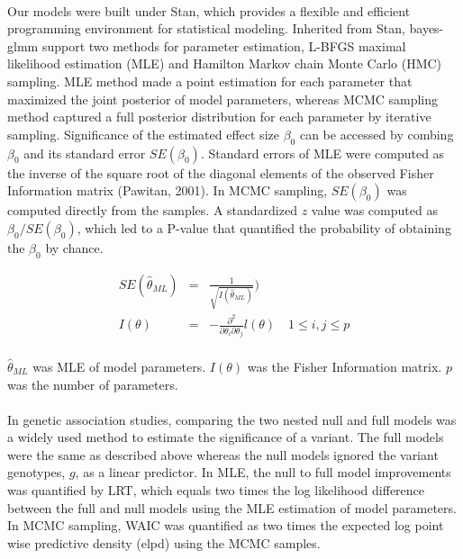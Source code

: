 \documentclass[12pt]{article}
\begin{document}
\paragraph{}{
Our models were built under Stan, which provides a flexible and efficient programming environment for statistical modeling. Inherited from Stan, bayes-glmm support two methods for parameter estimation, L-BFGS maximal likelihood estimation (MLE) and Hamilton Markov chain Monte Carlo (HMC) sampling. MLE method made a point estimation for each parameter that maximized the joint posterior of model parameters, whereas MCMC sampling method captured a full posterior distribution for each parameter by iterative sampling. Significance of the estimated effect size $\beta_0$ can be accessed by combing $\beta_0$ and its standard error $SE(\beta_0)$. Standard errors of MLE were computed as the inverse of the square root of the diagonal elements of the observed Fisher Information matrix (Pawitan, 2001). In MCMC sampling, $SE(\beta_0)$ was computed directly from the samples. A standardized $z$ value was computed as $\beta_0 / SE(\beta_0)$, which led to a P-value that quantified the probability of obtaining the $\beta_0$ by chance.
}


\begin{eqnarray}
SE(\hat{\theta}_{ML}) & = & \frac{1}{\sqrt{I(\hat{\theta}_{ML})}}) \\
I(\theta) & = & - \frac{\partial^2}{\partial \theta_i \partial \theta_j} l(\theta) \quad 1 \leq i,j \leq p
\end{eqnarray}

\paragraph{}{
$\hat{\theta}_{ML}$ was MLE of model parameters. $I(\theta)$ was the Fisher Information matrix. $p$ was the number of parameters.
}

\paragraph{}{
In genetic association studies, comparing the two nested null and full models was a widely used method to estimate the significance of a variant. The full models were the same as described above whereas the null models ignored the variant genotypes, $g$, as a linear predictor. In MLE, the null to full model improvements was quantified by LRT, which equals two times the log likelihood difference between the full and null models using the MLE estimation of model parameters. In MCMC sampling, WAIC was quantified as two times the expected log point wise predictive density (elpd) using the MCMC samples.
}
\end{document}
